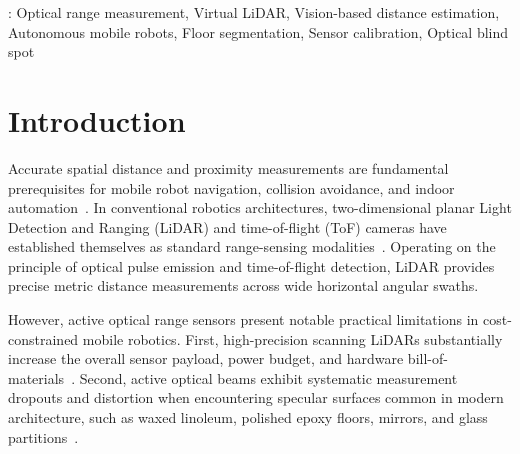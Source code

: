\documentclass[12pt]{iopart}
\begin{document}
\vspace{2pc}
: Optical range measurement, Virtual LiDAR, Vision-based distance estimation, Autonomous mobile robots, Floor segmentation, Sensor calibration, Optical blind spot

\section{Introduction}
\label{sec:introduction}

Accurate spatial distance and proximity measurements are fundamental prerequisites for mobile robot navigation, collision avoidance, and indoor automation~\cite{gvrnextgenerationtechnologiesresearchteam_2026_autonomous,liu_2024_a}. In conventional robotics architectures, two-dimensional planar Light Detection and Ranging (LiDAR) and time-of-flight (ToF) cameras have established themselves as standard range-sensing modalities~\cite{li_2020_lidar,thrun_2010_probabilistic,elfes_1989_using}. Operating on the principle of optical pulse emission and time-of-flight detection, LiDAR provides precise metric distance measurements across wide horizontal angular swaths.

However, active optical range sensors present notable practical limitations in cost-constrained mobile robotics. First, high-precision scanning LiDARs substantially increase the overall sensor payload, power budget, and hardware bill-of-materials~\cite{liu_2024_a}. Second, active optical beams exhibit systematic measurement dropouts and distortion when encountering specular surfaces common in modern architecture, such as waxed linoleum, polished epoxy floors, mirrors, and glass partitions~\cite{deepthadamodaran_2023_experimental,yang_2011_on,tibebu_2021_lidarbased,sajjan_2020_clear}.
\end{document}
